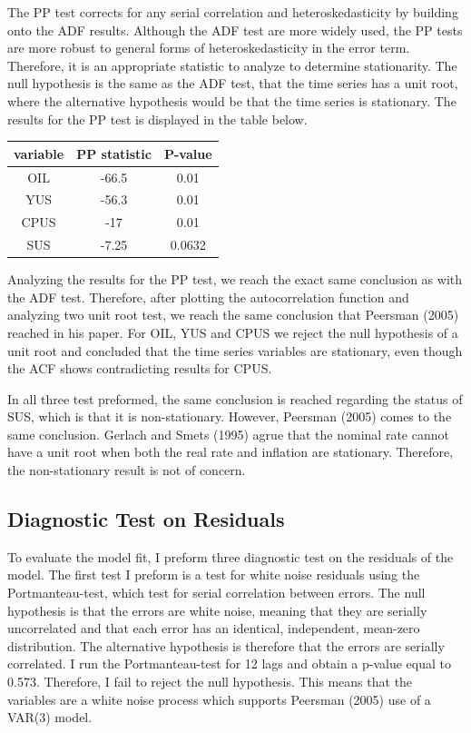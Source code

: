 \documentclass[11pt,preprint, authoryear]{elsarticle}
\numberwithin{equation}{section}
\numberwithin{figure}{section}
\numberwithin{table}{section}
\begin{document}
The PP test corrects for any serial correlation and heteroskedasticity
by building onto the ADF results. Although the ADF test are more widely
used, the PP tests are more robust to general forms of
heteroskedasticity in the error term. Therefore, it is an appropriate
statistic to analyze to determine stationarity. The null hypothesis is
the same as the ADF test, that the time series has a unit root, where
the alternative hypothesis would be that the time series is stationary.
The results for the PP test is displayed in the table below.

\begin{center}
\begin{tabular}{ |c|c|c| } 
 \hline
 variable & PP statistic & P-value \\ 
 \hline
 OIL & -66.5 & 0.01\\ 
 YUS & -56.3 & 0.01 \\
 CPUS & -17 & 0.01 \\
 SUS & -7.25 & 0.0632 \\
 \hline
\end{tabular}
\end{center}

Analyzing the results for the PP test, we reach the exact same
conclusion as with the ADF test. Therefore, after plotting the
autocorrelation function and analyzing two unit root test, we reach the
same conclusion that Peersman (2005) reached in his paper. For OIL, YUS
and CPUS we reject the null hypothesis of a unit root and concluded that
the time series variables are stationary, even though the ACF shows
contradicting results for CPUS.

In all three test preformed, the same conclusion is reached regarding
the status of SUS, which is that it is non-stationary. However, Peersman
(2005) comes to the same conclusion. Gerlach and Smets (1995) agrue that
the nominal rate cannot have a unit root when both the real rate and
inflation are stationary. Therefore, the non-stationary result is not of
concern.

\hypertarget{diagnostic-test-on-residuals}{%
\subsection{Diagnostic Test on
Residuals}\label{diagnostic-test-on-residuals}}

To evaluate the model fit, I preform three diagnostic test on the
residuals of the model. The first test I preform is a test for white
noise residuals using the Portmanteau-test, which test for serial
correlation between errors. The null hypothesis is that the errors are
white noise, meaning that they are serially uncorrelated and that each
error has an identical, independent, mean-zero distribution. The
alternative hypothesis is therefore that the errors are serially
correlated. I run the Portmanteau-test for 12 lags and obtain a p-value
equal to 0.573. Therefore, I fail to reject the null hypothesis. This
means that the variables are a white noise process which supports
Peersman (2005) use of a VAR(3) model.
\end{document}
